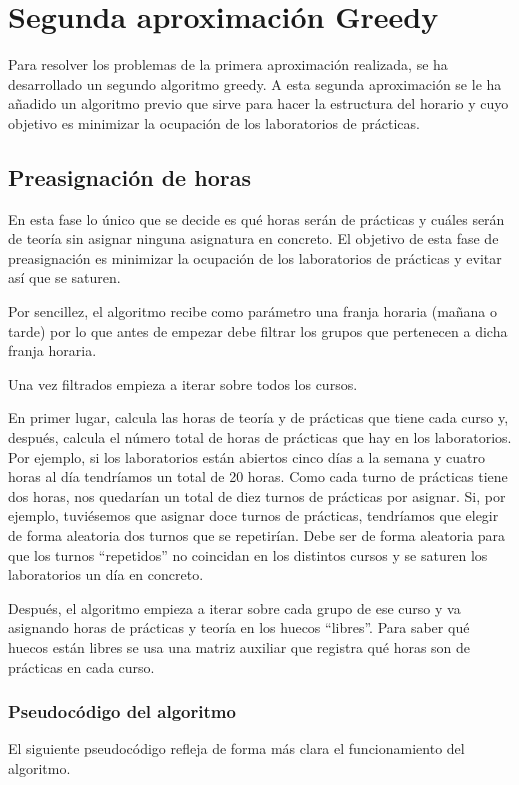 \chapter{Segunda aproximación Greedy}
Para resolver los problemas de la primera aproximación realizada, se ha desarrollado un segundo algoritmo greedy. A esta segunda aproximación se le ha añadido un algoritmo previo que sirve para hacer la estructura del horario y cuyo objetivo es minimizar la ocupación de los laboratorios de prácticas.

\section{Preasignación de horas}
En esta fase lo único que se decide es qué horas serán de prácticas y cuáles serán de teoría sin asignar ninguna asignatura en concreto. El objetivo de esta fase de preasignación es minimizar la ocupación de los laboratorios de prácticas y evitar así que se saturen.

Por sencillez, el algoritmo recibe como parámetro una franja horaria (mañana o tarde) por lo que antes de empezar debe filtrar los grupos que pertenecen a dicha franja horaria.

Una vez filtrados empieza a iterar sobre todos los cursos. 

En primer lugar, calcula las horas de teoría y de prácticas que tiene cada curso y, después, calcula el número total de horas de prácticas que hay en los laboratorios. Por ejemplo, si los laboratorios están abiertos cinco días a la semana y cuatro horas al día tendríamos un total de 20 horas. Como cada turno de prácticas tiene dos horas, nos quedarían un total de diez turnos de prácticas por asignar. Si, por ejemplo, tuviésemos que asignar doce turnos de prácticas, tendríamos que elegir de forma aleatoria dos turnos que se repetirían. Debe ser de forma aleatoria para que los turnos ``repetidos'' no coincidan en los distintos cursos y se saturen los laboratorios un día en concreto.

Después, el algoritmo empieza a iterar sobre cada grupo de ese curso y va asignando horas de prácticas y teoría en los huecos ``libres''. Para saber qué huecos están libres se usa una matriz auxiliar que registra qué horas son de prácticas en cada curso.

\subsection{Pseudocódigo del algoritmo}
El siguiente pseudocódigo refleja de forma más clara el funcionamiento del algoritmo.


